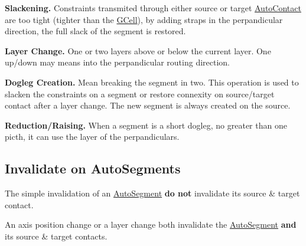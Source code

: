 \begin{DoxyItemize}
\item {\bfseries Slackening.} Constraints transmited through either source or target \hyperlink{classKatabatic_1_1AutoContact}{Auto\+Contact} are too tight (tighter than the \hyperlink{classKatabatic_1_1GCell}{G\+Cell}), by adding straps in the perpandicular direction, the full slack of the segment is restored. 
\item {\bfseries Layer Change.} One or two layers above or below the current layer. One up/down may means into the perpandicular routing direction. 
\item {\bfseries Dogleg Creation.} Mean breaking the segment in two. This operation is used to slacken the constraints on a segment or restore connexity on source/target contact after a layer change. The new segment is always created on the source. 
\item {\bfseries Reduction/\+Raising.} When a segment is a short dogleg, no greater than one picth, it can use the layer of the perpandiculars. 
\end{DoxyItemize}\hypertarget{classKatabatic_1_1AutoSegment_secASInvalidate}{}\subsection{Invalidate on Auto\+Segments}\label{classKatabatic_1_1AutoSegment_secASInvalidate}
The simple invalidation of an \hyperlink{classKatabatic_1_1AutoSegment}{Auto\+Segment} {\bfseries do not} invalidate it\textquotesingle{}s source \& target contact.

An axis position change or a layer change both invalidate the \hyperlink{classKatabatic_1_1AutoSegment}{Auto\+Segment} {\bfseries and} it\textquotesingle{}s source \& target contacts.


